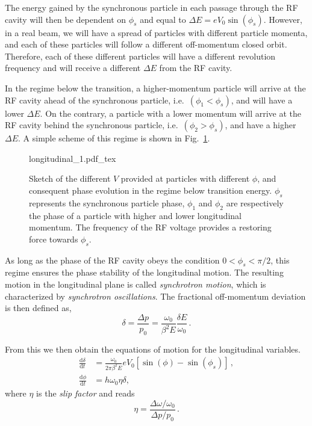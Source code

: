 The energy gained by the synchronous particle in each passage through the RF cavity will then be dependent on $\phi_s$ and equal to $\Delta E=e V_0 \sin \left(\phi_s\right)$. However, in a real beam, we will have a spread of particles with different particle momenta, and each of these particles will follow a different off-momentum closed orbit. Therefore, each of these different particles will have a different revolution frequency and will receive a different $\Delta E$ from the RF cavity.

In the regime below the transition, a higher-momentum particle will arrive at the RF cavity ahead of the synchronous particle, i.e.\ $\left(\phi_1<\phi_s\right)$, and will have a lower $\Delta E$. On the contrary, a particle with a lower momentum will arrive at the RF cavity behind the synchronous particle, i.e.\ $\left(\phi_2>\phi_s\right)$, and have a higher $\Delta E$. A simple scheme of this regime is shown in Fig.~\ref{fig:long_1}.

\begin{figure}
    \centering
    \def\svgwidth{0.85\columnwidth}
    {longitudinal_1.pdf_tex}
    \caption{Sketch of the different $V$ provided at particles with different $\phi$, and consequent phase evolution in the regime below transition energy. $\phi_s$ represents the synchronous particle phase, $\phi_1$ and $\phi_2$ are respectively the phase of a particle with higher and lower longitudinal momentum. The frequency of the RF voltage provides a restoring force towards $\phi_s$.}
    \label{fig:long_1}
\end{figure}

As long as the phase of the RF cavity obeys the condition $0<\phi_s<\pi / 2$, this regime ensures the phase stability of the longitudinal motion. The resulting motion in the longitudinal plane is called \textit{synchrotron motion}, which is characterized by \textit{synchrotron oscillations}. The fractional off-momentum deviation is then defined as,
\begin{equation}
    \delta=\frac{\Delta p}{p_0}=\frac{\omega_0}{\beta^2 E} \frac{\delta E}{\omega_0} \,.
\end{equation}

From this we then obtain the equations of motion for the longitudinal variables.
\begin{equation}
    \begin{aligned}
    \frac{\mathrm{d} \delta}{\mathrm{d} t} &=\frac{\omega_0}{2 \pi \beta^2 E} e V_0\left[\sin (\phi)-\sin \left(\phi_s\right)\right] \,, \\
    \frac{\mathrm{d} \phi}{\mathrm{d} t} &=h \omega_0 \eta \delta,
    \end{aligned}
\end{equation}
where $\eta$ is the \textit{slip factor} and reads
\begin{equation}
    \eta=\frac{\Delta \omega / \omega_0}{\Delta p / p_0} \,.
\end{equation}

